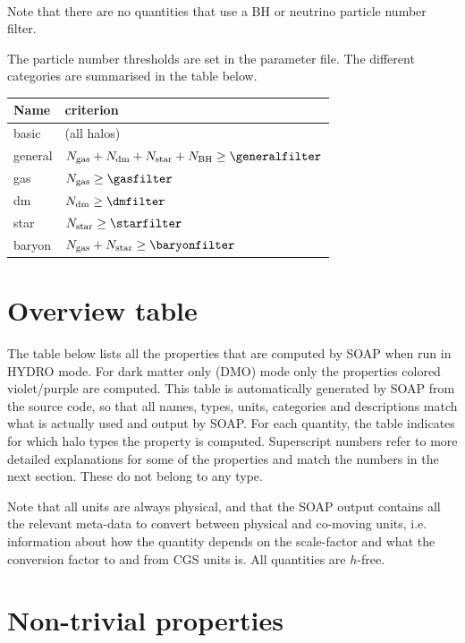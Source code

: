 \documentclass{article}
\begin{document}
\paragraph{}Note that there are no quantities that use a BH or neutrino particle number filter.

The particle number thresholds are set in the parameter file. The different categories are summarised in the table below.

\begin{longtable}{ll}
Name & criterion \\
\hline{}basic & (all halos) \\
general & $N_{\rm{}gas}+N_{\rm{}dm}+N_{\rm{}star}+N_{\rm{}BH} \geq{} \generalfilter$ \\
gas & $N_{\rm{}gas} \geq{} \gasfilter$ \\
dm & $N_{\rm{}dm} \geq{} \dmfilter$ \\
star & $N_{\rm{}star} \geq{} \starfilter$ \\
baryon & $N_{\rm{}gas}+N_{\rm{}star} \geq{} \baryonfilter$ \\
\end{longtable}

\section{Overview table}

The table below lists all the properties that are computed by SOAP when run in HYDRO mode. 
For dark matter only (DMO) mode only the properties colored violet/purple are computed.
This table is automatically generated by 
SOAP from the source code, so that all names, types, units, categories and descriptions match what is actually 
used and output by SOAP. For each quantity, the table indicates for which halo types the property is computed. 
Superscript numbers refer to more detailed explanations for some of the properties and match the numbers in 
the next section. These do not belong to 
any type. 

Note that all units are always physical, and that the SOAP output contains all the relevant meta-data to 
convert between physical and co-moving units, i.e. information about how the quantity depends on the 
scale-factor and what the conversion factor to and from CGS units is. All quantities are $h$-free.



\section{Non-trivial properties}
\end{document}
